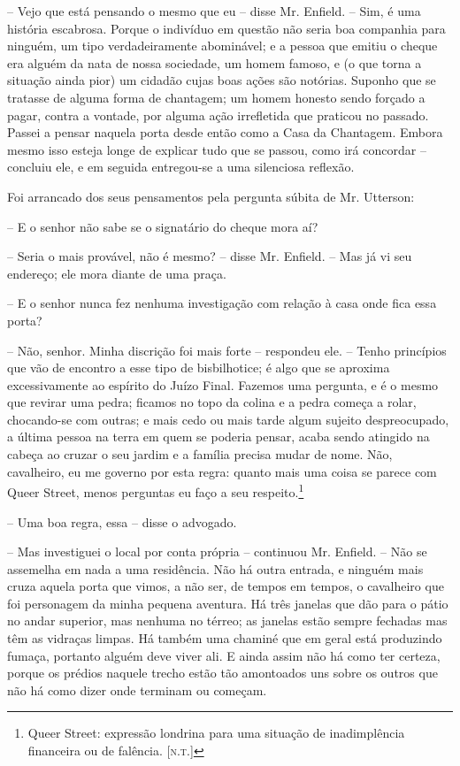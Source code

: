 -- Vejo que está pensando o mesmo que eu -- disse Mr. Enfield. -- Sim, é
uma história escabrosa.  Porque o indivíduo em questão não seria boa
companhia para ninguém, um tipo verdadeiramente abominável; e a pessoa
que emitiu o cheque era alguém da nata de nossa sociedade, um homem
famoso, e (o que torna a situação ainda pior) um cidadão cujas boas
ações são notórias.  Suponho que se tratasse de alguma forma de
chantagem; um homem honesto sendo forçado a pagar, contra a vontade,
por alguma ação irrefletida que praticou no passado.  Passei a pensar
naquela porta desde então como a Casa da Chantagem.  Embora mesmo isso
esteja longe de explicar tudo que se passou, como irá concordar -- 
concluiu ele, e em seguida entregou-se a uma silenciosa reflexão.

Foi arrancado dos seus pensamentos pela pergunta súbita de Mr. Utterson:

-- E o senhor não sabe se o signatário do cheque mora aí?

-- Seria o mais provável, não é mesmo? -- disse Mr. Enfield. -- Mas já vi
seu endereço; ele mora diante de uma praça. 

-- E o senhor nunca fez nenhuma investigação com relação à casa onde fica
essa porta?

-- Não, senhor.  Minha discrição foi mais forte -- respondeu ele. --
Tenho princípios que vão de encontro a esse tipo de bisbilhotice; é
algo que se aproxima excessivamente ao espírito do Juízo Final. 
Fazemos uma pergunta, e é o mesmo que revirar uma pedra; ficamos no
topo da colina e a pedra começa a rolar, chocando-se com outras; e mais
cedo ou mais tarde algum sujeito despreocupado, a última pessoa na
terra em quem se poderia pensar, acaba sendo atingido na cabeça ao
cruzar o seu jardim e a família precisa mudar de nome.  Não,
cavalheiro, eu me governo por esta regra: quanto mais uma coisa se
parece com Queer Street, menos perguntas eu faço a seu respeito.\footnote{
Queer Street: expressão londrina para uma situação de inadimplência
financeira ou de falência. [\textsc{n.t.}]}

-- Uma boa regra, essa -- disse o advogado. 

-- Mas investiguei o local por conta própria -- continuou Mr. Enfield. --
Não se assemelha em nada a uma residência.  Não há outra entrada, e
ninguém mais cruza aquela porta que vimos, a não ser, de tempos em
tempos, o cavalheiro que foi personagem da minha pequena aventura.  Há
três janelas que dão para o pátio no andar superior, mas nenhuma no
térreo; as janelas estão sempre fechadas mas têm as vidraças limpas. 
Há também uma chaminé que em geral está produzindo fumaça, portanto
alguém deve viver ali.  E ainda assim não há como ter certeza, porque
os prédios naquele trecho estão tão amontoados uns sobre os outros que
não há como dizer onde terminam ou começam.

